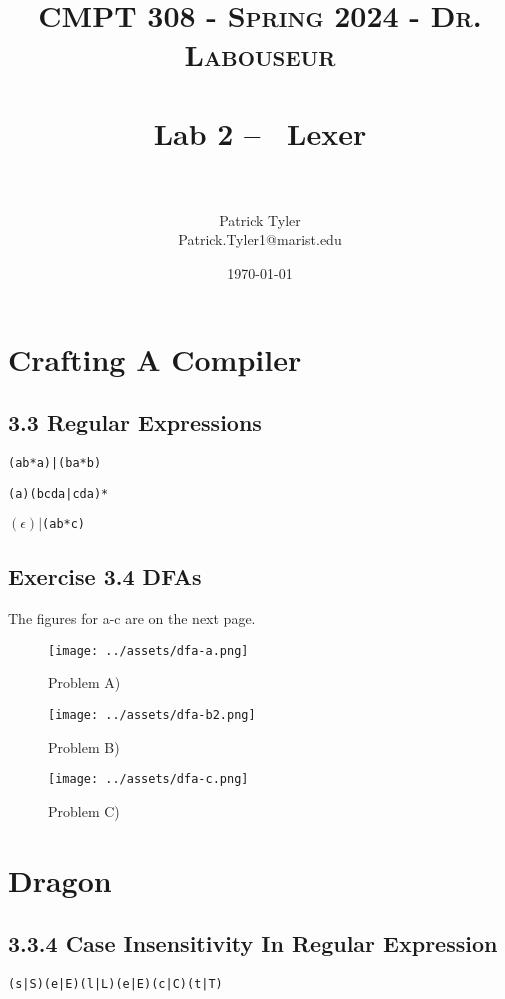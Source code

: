 \documentclass[letterpaper, 10pt]{article}
\title{	
   \normalfont \normalsize 
   \textsc{CMPT 308 - Spring 2024 - Dr. Labouseur} \\[10pt] %
   \horrule{0.5pt} \\[0.25cm] 	%
   \huge Lab 2 -- ~Lexer \\     	    %
   \horrule{0.5pt} \\[0.25cm] 	%
}
\author{Patrick Tyler \\ \normalsize Patrick.Tyler1@marist.edu}
\date{\normalsize\today} 	%
\begin{document}
\maketitle %


\section{Crafting A Compiler}
\subsection{3.3 Regular Expressions}
\begin{verbatim}
(ab*a)|(ba*b) 
\end{verbatim}
\begin{verbatim}
(a)(bcda|cda)*
\end{verbatim}
$(\epsilon)|$\verb|(ab*c)|
\subsection{Exercise 3.4 DFAs}
The figures for a-c are on the next page.
\begin{figure}[h]
  \centering
  \texttt{[image: ../assets/dfa-a.png]}
    \caption{Problem A)}
  \label{fig:dfa-a}
\end{figure}

\begin{figure}[h]
  \centering
  \texttt{[image: ../assets/dfa-b2.png]}
    \caption{Problem B)}
  \label{fig:dfa-b2}
\end{figure}

\begin{figure}[h]
  \centering
  \texttt{[image: ../assets/dfa-c.png]}
    \caption{Problem C)}
  \label{fig:dfa-c}
\end{figure}
\section{Dragon}
\subsection{3.3.4 Case Insensitivity In Regular Expression}
\begin{verbatim}
(s|S)(e|E)(l|L)(e|E)(c|C)(t|T)
\end{verbatim}
\end{document}
